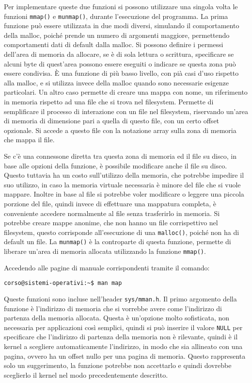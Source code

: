 \documentclass{article}
\numberwithin{equation}{subsection}
\begin{document}
Per implementare queste due funzioni si possono utilizzare una singola volta le funzioni \verb|mmap()| 
e \verb|munmap()|, durante l'esecuzione del programma. 
La prima funzione può essere utilizzata in due modi diversi, simulando il comportamento della malloc, 
poiché prende un numero di argomenti maggiore, permettendo comportamenti dati di default 
dalla malloc. Si possono definire i permessi dell'area di memoria da allocare, se è di sola 
lettura o scrittura, specificare se alcuni byte di quest'area possono essere eseguiti o indicare 
se questa zona può essere condivisa. \`{E} una funzione di più basso livello, con pià casi 
d'uso rispetto alla malloc, e si utilizza invece della malloc quando sono necessarie esigenze 
particolari. Un altro caso permette di creare una mappa con nome, un riferimento in memoria rispetto 
ad una file che si trova nel filesystem. Permette di semplificare il processo di interazione con 
un file nel filesystem, riservando un'area di memoria di dimensione pari a quella di questo file, con un certo offset opzionale. Si accede a questo file con la notazione array sulla zona di memoria che mappa il file. 

Se c'è una connessone diretta tra questa zona di memoria ed il file su disco, in base alle opzioni 
della funzione, è possibile modificare anche il file su disco. Questo tuttavia ha un costo 
sull'utilizzo della memoria, che potrebbe impedire il suo utilizzo, in caso la memoria virtuale 
necessaria è minore del file che si vuole mappare. Inoltre in base al file si potrebbe voler 
modificare o leggere una piccola porzione del file, quindi invece di effettuare una mappatura 
completa, è conveniente accedere normalmente al file senza trasferirlo in memoria. 
Si potrebbe creare mappe anonime, che non hanno un file corrispettivo nel filesystem, questo 
corrisponde all'esecuzione di una \verb|malloc()|, poiché non ha di default un file.  
La \verb|munmap()| è la controparte di questa funzione, permette di liberare un'area di memoria 
allocata utilizzando la funzione \verb|mmap()|. 

Accedendo alle pagine di manuale corrispondenti tramite il comando:
\begin{verbatim}
corso@sistemi-operativi:~$ man map
\end{verbatim}

Queste funzioni sono incluse nell'header \verb|sys/mman.h|. Il primo argomento della funzione è 
l'indirizzo di memoria che si vorrebbe avere come l'indirizzo di partenza della memoria 
allocata. Questa è un'opzione molto sofisticata, non necessaria per applicazioni così semplici, 
quindi si può inserire il valore \verb|NULL| per specificare che l'indirizzo di partenza della memoria non 
è rilevante, quindi è il kernel a scegliere automaticamente l'indirizzo, in modo che sia 
allineato con una pagina, ovvero ha un offset nullo per una pagina di memoria. 
Questo rappresenta solo un suggerimento, la funzione potrebbe non accettarlo e quindi dovrebbe 
sceglierlo il kernel nel modo precedentemente descritto. 
\end{document}
